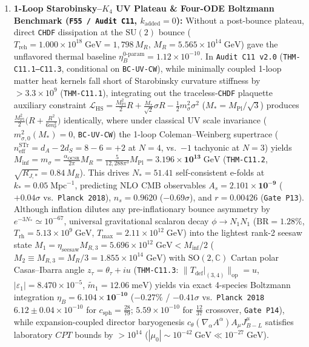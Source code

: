 \documentclass[11pt,a4paper]{article}
\begin{document}
\begin{enumerate}[label=(\arabic*),leftmargin=1.8em,itemsep=2pt]
\item \textbf{1-Loop Starobinsky--$K_4$ UV Plateau \& Four-ODE Boltzmann Benchmark (\texttt{F55 / Audit C11}, $k_{\mathrm{added}}=0$):} Without a post-bounce plateau, direct \texttt{CHDF} dissipation at the $\mathrm{SU}(2)$ bounce ($T_{\mathrm{reh}} = 1.000\times 10^{18}\;\mathrm{GeV} = 1{,}798\,M_R$, $M_R = 5.565\times 10^{14}\;\mathrm{GeV}$) gave the unflavored thermal baseline $\eta_B^{\mathrm{0\text{-}param}} = 1.12\times 10^{-10}$. In \texttt{Audit~C11 v2.0} (\texttt{THM-C11.1--C11.3}, conditional on \texttt{BC-UV-CW}), while minimally coupled 1-loop matter heat kernels fall short of Starobinsky curvature stiffness by $>3.3\times 10^9$ (\texttt{THM-C11.1}), integrating out the traceless-\texttt{CHDF} plaquette auxiliary constraint $\mathcal{L}_{\mathrm{HS}} = \frac{M_{\mathrm{Pl}}^2}{2}R + \frac{M_*}{\sqrt{2}}\sigma R - \frac{1}{2}m_\sigma^2\sigma^2$ ($M_* = M_{\mathrm{Pl}}/\sqrt{3}$) produces $\frac{M_{\mathrm{Pl}}^2}{2}\bigl(R + \frac{R^2}{6m_\sigma^2}\bigr)$ identically, where under classical UV scale invariance ($m_{\sigma,0}^2(M_*)=0$, \texttt{BC-UV-CW}) the 1-loop Coleman--Weinberg supertrace ($n_{\mathrm{eff}}^{\mathrm{STr}} = d_A - 2d_S = 8 - 6 = +2$ at $N=4$, vs.\ $-1$ tachyonic at $N=3$) yields $M_{\mathrm{inf}} = m_\sigma = \frac{\alpha_{\mathrm{OCSR}}}{2\pi}M_R = \frac{5}{12{,}288\pi^3}M_{\mathrm{Pl}} = \mathbf{3.196\times 10^{13}\;\mathrm{GeV}}$ (\texttt{THM-C11.2}, $\sqrt{R_{J,*}} = 0.84\,M_R$). This drives $N_* = 51.41$ self-consistent e-folds at $k_* = 0.05\;\mathrm{Mpc}^{-1}$, predicting NLO CMB observables $A_s = \mathbf{2.101\times 10^{-9}}$ ($+0.04\sigma$ vs.\ \texttt{Planck 2018}), $n_s = \mathbf{0.9620}$ ($-0.69\sigma$), and $r = \mathbf{0.00426}$ (\texttt{Gate~P13}). Although inflation dilutes any pre-inflationary bounce asymmetry by $e^{-3N_*} \simeq 10^{-67}$, universal gravitational scalaron decay $\phi \to N_1 N_1$ ($\mathrm{BR} = 1.28\%$, $T_{\mathrm{rh}} = 5.13\times 10^9\;\mathrm{GeV}$, $T_{\max} = 2.11\times 10^{12}\;\mathrm{GeV}$) into the lightest rank-2 seesaw state $M_1 = \eta_{\mathrm{seesaw}}M_{R,3} = 5.696\times 10^{12}\;\mathrm{GeV} < M_{\mathrm{inf}}/2$ ($M_2 \equiv M_{R,3} = M_R/3 = 1.855\times 10^{14}\;\mathrm{GeV}$) with $\mathrm{SO}(2,\mathbb{C})$ Cartan polar Casas--Ibarra angle $z_\tau = \theta_\tau + i u$ (\texttt{THM-C11.3}: $\|T_{\mathrm{def}}|_{(3,4)}\|_{\mathrm{op}} = u$, $|\varepsilon_1| = 8.470\times 10^{-5}$, $\tilde{m}_1 = 12.06\;\mathrm{meV}$) yields via exact 4-species Boltzmann integration $\eta_B = \mathbf{6.104\times 10^{-10}}$ ($-0.27\%$ / $-0.41\sigma$ vs.\ \texttt{Planck 2018} $6.12 \pm 0.04\times 10^{-10}$ for $c_{\mathrm{sph}} = \frac{28}{79}$; $5.59\times 10^{-10}$ for $\frac{12}{37}$ crossover, \texttt{Gate~P14}), while expansion-coupled director baryogenesis $c_\theta(\nabla_\alpha A^\alpha)A_\mu J_{B-L}^\mu$ satisfies laboratory $CPT$ bounds by $>10^{14}$ ($|\mu_0| \sim 10^{-42}\;\mathrm{GeV} \ll 10^{-27}\;\mathrm{GeV}$).

\end{enumerate}
\end{document}
